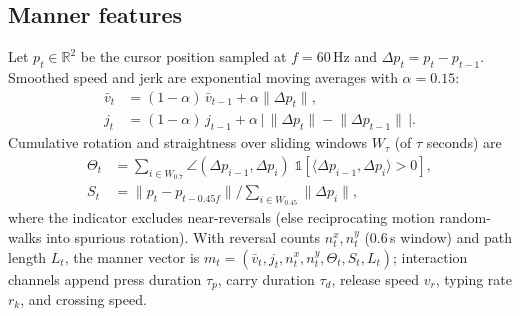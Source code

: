 \documentclass[sigconf,nonacm]{acmart}
\begin{document}
\subsection{Manner features}
Let $p_t \in \mathbb{R}^2$ be the cursor position sampled at $f{=}60$\,Hz and $\Delta p_t = p_t - p_{t-1}$. Smoothed speed and jerk are exponential moving averages with $\alpha{=}0.15$:
\begin{align}
\bar v_t &= (1{-}\alpha)\,\bar v_{t-1} + \alpha \lVert \Delta p_t \rVert,
\label{eq:ema}\\
j_t &= (1{-}\alpha)\, j_{t-1} + \alpha \,\bigl|\, \lVert\Delta p_t\rVert - \lVert\Delta p_{t-1}\rVert \,\bigr|. \nonumber
\end{align}
Cumulative rotation and straightness over sliding windows $W_\tau$ (of $\tau$ seconds) are
\begin{align}
\Theta_t &= \!\!\sum_{i \in W_{0.7}}\!\! \angle(\Delta p_{i-1}, \Delta p_i)\;
\mathbb{1}\!\left[\langle \Delta p_{i-1}, \Delta p_i\rangle > 0\right],
\label{eq:turn}\\
S_t &= \lVert p_t - p_{t - 0.45 f} \rVert \Big/ \textstyle\sum_{i \in W_{0.45}} \lVert \Delta p_i \rVert, \nonumber
\end{align}
where the indicator excludes near-reversals (else reciprocating motion random-walks into spurious rotation). With reversal counts $n^x_t, n^y_t$ (0.6\,s window) and path length $L_t$, the manner vector is $m_t = (\bar v_t, j_t, n^x_t, n^y_t, \Theta_t, S_t, L_t)$; interaction channels append press duration $\tau_p$, carry duration $\tau_d$, release speed $v_r$, typing rate $r_k$, and crossing speed.
\end{document}
